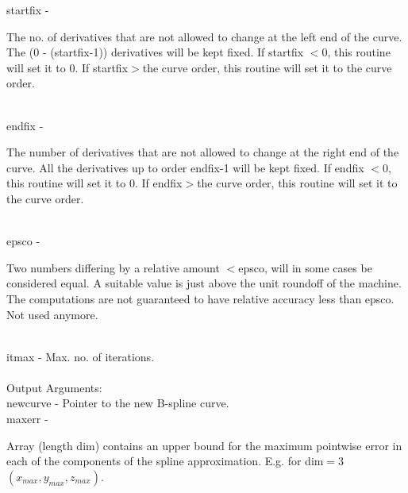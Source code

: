         \>\>    {\fov startfix}\> - \>  \begin{minipg2}
                                The no. of derivatives that are not allowed to
                                change at the left end of the curve. The (0 -
                                (startfix-1)) derivatives will be kept fixed. If startfix
                                $<$0, this routine will set it to 0. If startfix$>$the curve order, this
                                routine will set it to the curve order.
                                \end{minipg2}\\[0.8ex]
        \>\>    {\fov endfix}   \> - \> \begin{minipg2}
                                The number of derivatives that are not allowed to
                                change at the right end of the curve. All the derivatives up to order endfix-1 will be kept fixed. If endfix
                                $<$0, this routine will set it to 0. If endfix$>$the curve order, this
                                routine will set it to the curve order.
                                \end{minipg2}\\[0.8ex]
        \>\>    {\fov epsco}    \> - \> \begin{minipg2}
                                Two numbers differing by a relative amount
                                $<$epsco, will in some cases be considered equal. A
                                suitable value is just above the unit roundoff of the
                                machine. The computations are not guaranteed to
                                have relative accuracy less than
                                epsco. Not used anymore.
                                \end{minipg2}\\[0.3ex]
        \>\>    {\fov itmax}    \> - \> Max. no. of iterations.\\
\\
        \>Output Arguments:\\
        \>\>    {\fov newcurve}\> - \>  Pointer to the new B-spline curve.\\
        \>\>    {\fov maxerr}   \> - \> \begin{minipg2}
                                Array (length dim)
                                contains an upper bound
                                for the  maximum
                                pointwise error in each of the components
                                of the spline approximation. E.g.
                                for dim$=$3 $(x_{max},y_{max},z_{max})$.
                                \end{minipg2}\\[0.3ex]
